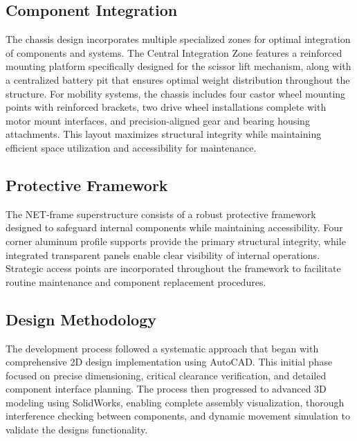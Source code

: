 \documentclass[../../main]{subfiles}
\begin{document}
\subsection{Component Integration}\label{component-integration}

The chassis design incorporates multiple specialized zones for optimal
integration of components and systems. The Central Integration Zone
features a reinforced mounting platform specifically designed for the
scissor lift mechanism, along with a centralized battery pit that
ensures optimal weight distribution throughout the structure. For
mobility systems, the chassis includes four castor wheel mounting points
with reinforced brackets, two drive wheel installations complete with
motor mount interfaces, and precision-aligned gear and bearing housing
attachments. This layout maximizes structural integrity while
maintaining efficient space utilization and accessibility for
maintenance.

\subsection{Protective Framework}\label{protective-framework}

The NET-frame superstructure consists of a robust protective framework
designed to safeguard internal components while maintaining
accessibility. Four corner aluminum profile supports provide the primary
structural integrity, while integrated transparent panels enable clear
visibility of internal operations. Strategic access points are
incorporated throughout the framework to facilitate routine maintenance
and component replacement procedures.


\subsection{Design Methodology}\label{design-methodology}

The development process followed a systematic approach that began with
comprehensive 2D design implementation using AutoCAD. This initial phase
focused on precise dimensioning, critical clearance verification, and
detailed component interface planning. The process then progressed to
advanced 3D modeling using SolidWorks, enabling complete assembly
visualization, thorough interference checking between components, and
dynamic movement simulation to validate the design\textquotesingle s
functionality.
\end{document}
